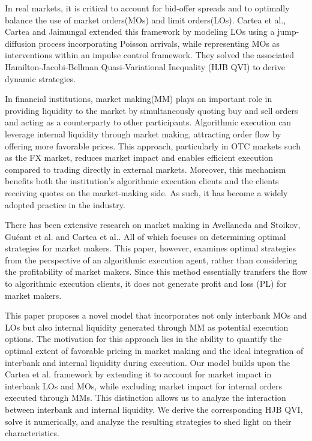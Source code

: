 \documentclass[12pt]{article}
\begin{document}
In real markets, it is critical to account for bid-offer spreads and to optimally balance the use of market orders(MOs) and limit orders(LOs). 
Cartea et al.\cite{cartea2015algorithmic}, Cartea and Jaimungal \cite{cartea2015optimal} extended this framework by modeling LOs using a jump-diffusion process incorporating Poisson arrivals, while representing MOs as interventions within an impulse control framework. 
They solved the associated Hamilton-Jacobi-Bellman Quasi-Variational Inequality (HJB QVI) to derive dynamic strategies.

In financial institutions, market making(MM) plays an important role in providing liquidity to the market by simultaneously quoting buy and sell orders and acting as a counterparty to other participants. 
Algorithmic execution can leverage internal liquidity through market making, attracting order flow by offering more favorable prices. 
This approach, particularly in OTC markets such as the FX market, reduces market impact and enables efficient execution compared to trading directly in external markets.
Moreover, this mechanism benefits both the institution’s algorithmic execution clients and the clients receiving quotes on the market-making side. 
As such, it has become a widely adopted practice in the industry.

There has been extensive research on market making in Avellaneda and Stoikov\cite{avellaneda2008high}, Gu\'eant et al.\cite{gueant2013dealing} and Cartea et al.\cite{cartea2017algorithmic}.
All of which focuses on determining optimal strategies for market makers. 
This paper, however, examines optimal strategies from the perspective of an algorithmic execution agent, 
rather than considering the profitability of market makers. 
Since this method essentially transfers the flow to algorithmic execution clients, 
it does not generate profit and loss (PL) for market makers. 

This paper proposes a novel model that incorporates not only interbank MOs and LOs but also internal liquidity generated through MM as potential execution options. 
The motivation for this approach lies in the ability to quantify the optimal extent of favorable pricing in market making and the ideal integration of interbank and internal liquidity during execution.
Our model builds upon the Cartea et al.\cite{cartea2015algorithmic} framework by extending it to account for market impact in interbank LOs and MOs, while excluding market impact for internal orders executed through MMs. 
This distinction allows us to analyze the interaction between interbank and internal liquidity. 
We derive the corresponding HJB QVI, solve it numerically, and analyze the resulting strategies to shed light on their characteristics.
\end{document}
